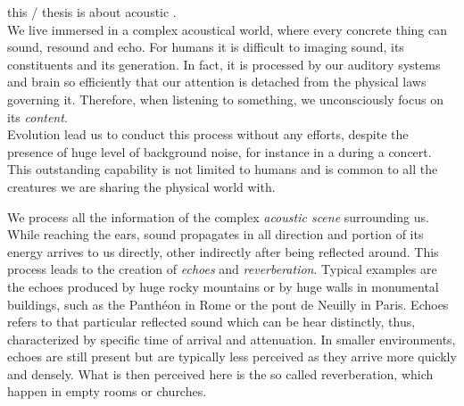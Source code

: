  this \PhD/ thesis is about acoustic
.
\\We live immersed in a complex acoustical world, where every concrete thing can sound, resound and echo.
For humans it is difficult to imaging sound, its constituents and its generation.
In fact, it is processed by our auditory systems and brain so efficiently that our attention is detached from the physical laws governing it.
Therefore, when listening to something, we unconsciously focus on its \textit{content}.
\\Evolution lead us to conduct this process without any efforts, despite the presence of huge level of background noise, for instance in a during a concert.
This outstanding capability is not limited to humans and is common to all the creatures we are sharing the physical world with.

\mynewline
We process all the information of the complex \textit{acoustic scene} surrounding us.
While reaching the ears, sound propagates in all direction and portion of its energy arrives to us directly, other indirectly after being reflected around.
This process leads to the creation of \textit{echoes} and \textit{reverberation}.
Typical examples are the echoes produced by huge rocky mountains or by huge walls in monumental buildings, such as the Panthéon in Rome or the pont de Neuilly in Paris.
Echoes refers to that particular reflected sound which can be hear distinctly, thus, characterized by specific time of arrival and attenuation.
In smaller environments, echoes are still present but are typically less perceived as they arrive more quickly and densely.
What is then perceived here is the so called reverberation, which happen in empty rooms or churches.

